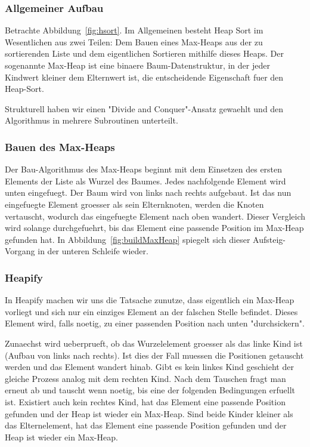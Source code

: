 \documentclass[11pt]{article}
\begin{document}
        \subsubsection{Allgemeiner Aufbau}
    Betrachte Abbildung~\ref{fig:hsort}.
    Im Allgemeinen besteht Heap Sort im Wesentlichen aus zwei Teilen:
    Dem Bauen eines Max-Heaps aus der zu sortierenden Liste und dem eigentlichen Sortieren mithilfe dieses Heaps.
    Der sogenannte Max-Heap ist eine binaere Baum-Datenstruktur, in der jeder Kindwert kleiner dem Elternwert ist, die entscheidende Eigenschaft fuer den Heap-Sort. 
    
    Strukturell haben wir einen "Divide and Conquer"-Ansatz gewaehlt und den Algorithmus in mehrere Subroutinen unterteilt.
    
    \subsubsection{Bauen des Max-Heaps}
    Der Bau-Algorithmus des Max-Heaps beginnt mit dem Einsetzen des ersten Elements der Liste als Wurzel des Baumes.
    Jedes nachfolgende Element wird unten eingefuegt. Der Baum wird von links nach rechts aufgebaut.
    Ist das nun eingefuegte Element groesser als sein Elternknoten, werden die Knoten vertauscht, wodurch das eingefuegte Element nach oben wandert.
    Dieser Vergleich wird solange durchgefuehrt, bis das Element eine passende Position im Max-Heap gefunden hat.
    In Abbildung~\ref{fig:buildMaxHeap} spiegelt sich dieser Aufsteig-Vorgang in der unteren Schleife wieder. 
    
    \subsubsection{Heapify}
    In Heapify machen wir uns die Tatsache zunutze, dass eigentlich ein Max-Heap vorliegt und sich nur ein einziges Element an der falschen Stelle befindet.
    Dieses Element wird, falls noetig, zu einer passenden Position nach unten "durchsickern".
    
    Zunaechst wird ueberprueft, ob das Wurzelelement groesser als das linke Kind ist (Aufbau von links nach rechts).
    Ist dies der Fall muessen die Positionen getauscht werden und das Element wandert hinab.
    Gibt es kein linkes Kind geschieht der gleiche Prozess analog mit dem rechten Kind.
    Nach dem Tauschen fragt man erneut ab und tauscht wenn noetig, bis eine der folgenden Bedingungen erfuellt ist.
    Existiert auch kein rechtes Kind, hat das Element eine passende Position gefunden und der Heap ist wieder ein Max-Heap.
    Sind beide Kinder kleiner als das Elternelement, hat das Element eine passende Position gefunden und der Heap ist wieder ein Max-Heap.
    
\end{document}
